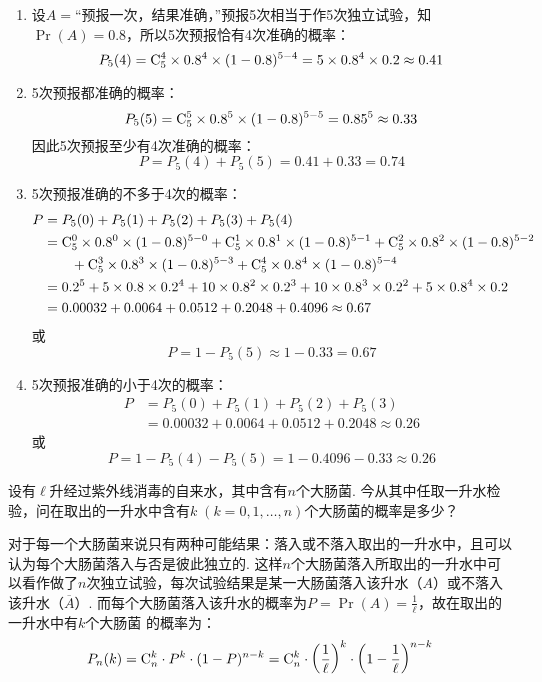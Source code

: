 \begin{solution}
\begin{enumerate}[(1)]
    \item 设$A=$“预报一次，结果准确，”预报5次相当于作5次独立试验，知$\Pr(A)=0.8$，所以5次预报恰有4次准确的概率：
\[P_5(4)={\rm C}^{4}_{5}\times0.8^4\times(1-0.8)^{5-4}=5\times0.8^4\times0.2\approx 0.41\]
\item 5次预报都准确的概率：
\[P_5(5)={\rm C}^{5}_{5}\times0.8^5\times(1-0.8)^{5-5}=0.85^5\approx 0.33\]
因此5次预报至少有4次准确的概率：
\[P=P_5(4)+P_5(5)=0.41+0.33=0.74\]
\item 5次预报准确的不多于4次的概率：
\[\begin{split}
    P&=P_{5}(0)+P_{5}(1)+P_{5}(2)+P_{5}(3)+P_{5}(4)\\
&={\rm C}_{5}^{0}\times 0.8^{0}\times(1-0.8)^{5-0}+{\rm C}_{5}^{1}\times0.8^{1}\times(1-0.8)^{5-1}+{\rm C}_{5}^{2}\times0.8^{2}\times(1-0.8)^{5-2}\\
&\qquad +{\rm C}_{5}^{3}\times0.8^{3}\times(1-0.8)^{5-3}+{\rm C}_{5}^{4}\times 0.8^{4}\times (1-0.8)^{5- 4}\\
&=0.2^{5}+5\times0.8\times0.2^{4}+10\times0.8^{2}\times0.2^{3}+10\times0.8^{3}\times0.2^{2}+5\times0.8^{4}\times0.2\\
&=0.00032+0.0064+0.0512+0.2048+0.4096\approx0.67
\end{split} \]
或
\[P=1-P_{5}(5)\approx 1-0.33=0.67\]

\item 5次预报准确的小于4次的概率：
\[\begin{split}
    P&=P_{5}(0)+P_{5}(1)+P_{5}(2)+P_{5}(3)\\
    &=0.00032+0.0064+0.0512+0.2048\approx 0.26
\end{split}\]
或
\[P=1-P_{5}(4)-P_{5}(5)=1-0.4096-0.33\approx 0.26\]
\end{enumerate}
\end{solution}

\begin{example}
    设有$\ell$升经过紫外线消毒的自来水，其中含有$n$个大肠菌. 今从其中任取一升水检验，问在取出的一升水中含有$k\; (k=0,1,\ldots,n)$个大肠菌的概率是多少？
\end{example}

\begin{solution}
  对于每一个大肠菌来说只有两种可能结果：落入或不落入取出的一升水中，且可以认为每个大肠菌落入与否是彼此独立的. 这样$n$个大肠菌落入所取出的一升水中可以看作做了$n$次独立试验，每次试验结果是某一大肠菌落入该升水（$A$）或不落入该升水（$\overline{A}$）. 而每个大肠菌落入该升水的概率为$P=\Pr(A)=\frac{1}{\ell}$，故在取出的一升水中有$k$个大肠菌
的概率为：
\[P_n(k)={\rm C}^{k}_{n}\cdot P^k\cdot (1-P)^{n-k}={\rm C}^{k}_{n}\cdot \left(\dfrac{1}{\ell}\right)^k\cdot \left(1-\dfrac{1}{\ell}\right)^{n-k}  \]
\end{solution}



